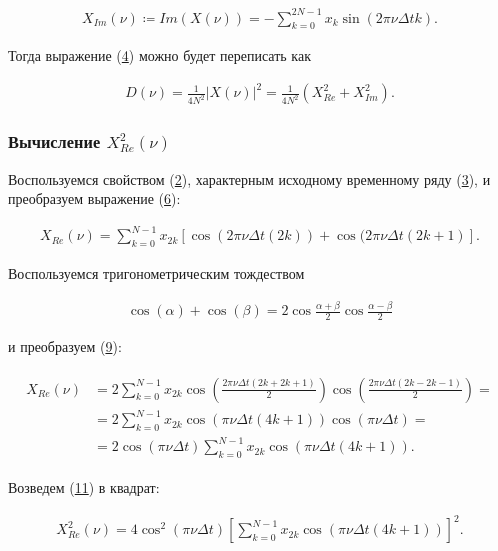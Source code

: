 \documentclass[12pt]{article}
\newcommand{\hl}[1]{(\hyperlink{eq:#1}{#1})}
\newcommand{\s}[2]{\hypertarget{skip:#1}{\vspace{#2pt}}}
\newcommand{\sd}[1]{\hypertarget{skip:#1}{\vspace{-10pt}}}
\newcommand{\hep}[2]{\vspace{#2pt}\hypertarget{eq:#1}{}\vspace{-#2pt}}
\newcommand{\hs}[1]{\sd{#1}\hep{#1}{18}}
\begin{document}
\s{7}{-20}
\begin{gather}
    X_{Im}(\nu) \coloneqq {Im}(X(\nu)) = - \sum_{k = 0}^{2 N - 1} x_k \sin(2 \pi \nu \Delta t k).
\end{gather}

Тогда выражение \hl{4} можно будет переписать как

\hs{8}
\begin{gather}
    D(\nu) = \frac{1}{4 N^2} | X(\nu) |^2 = \frac{1}{4 N^2} (X_{Re}^2 + X_{Im}^2).
\end{gather}

\subsubsection{Вычисление $ X_{Re}^2(\nu) $}

Воспользуемся свойством \hl{2}, характерным исходному временному ряду \hl{3}, и преобразуем выражение \hl{6}:

\hs{9}
\begin{gather}
    X_{Re}(\nu) = \sum_{k = 0}^{N - 1} x_{2 k} [ \cos(2 \pi \nu \Delta t (2 k)) + \cos(2 \pi \nu \Delta t (2 k + 1) ].
\end{gather}

Воспользуемся тригонометрическим тождеством

\sd{10}
\begin{gather}
    \cos(\alpha) + \cos(\beta) = 2 \cos \frac{\alpha + \beta}{2} \cos \frac{\alpha - \beta}{2}
\end{gather}

и преобразуем \hl{9}:

\hs{11}
\begin{gather}
\begin{split}
    X_{Re}(\nu) &= 2 \sum_{k = 0}^{N - 1} x_{2 k} \cos\left( \frac{2 \pi \nu \Delta t (2k + 2k + 1)}{2} \right) \cos\left( \frac{2 \pi \nu \Delta t (2 k - 2 k - 1) }{2} \right) = \\
    &= 2 \sum_{k = 0}^{N - 1} x_{2 k} \cos( \pi \nu \Delta t (4k + 1) ) \cos( \pi \nu \Delta t) = \\
    &= 2 \cos( \pi \nu \Delta t) \sum_{k = 0}^{N - 1} x_{2 k} \cos( \pi \nu \Delta t (4k + 1) ).
\end{split}
\end{gather}

Возведем \hl{11} в квадрат:

\sd{12}\hep{12}{20}
\begin{gather}
    X_{Re}^2(\nu) = 4 \cos^2(\pi \nu \Delta t) \left[ \sum_{k = 0}^{N - 1} x_{2 k} \cos(\pi \nu \Delta t (4 k + 1) ) \right]^2.
\end{gather}
\end{document}
